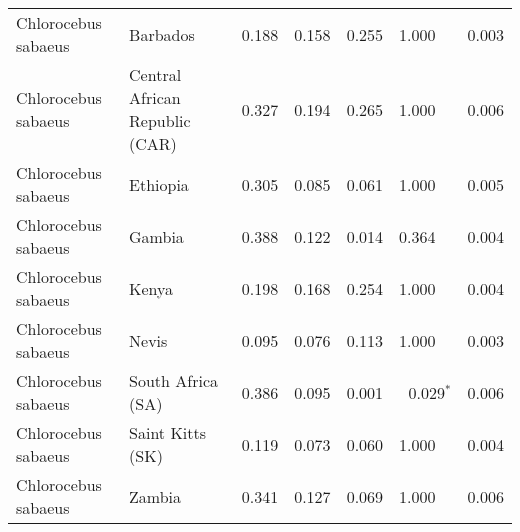 \begin{center}
\begin{adjustbox}{width = 1\textwidth}
\begin{tabular}{|l|l|r|r|r|r|r|}
 Chlorocebus sabaeus &                        Barbados &                                              0.188 &                                              0.158 &                0.255 &                                  1.000~~ &              0.003 \\
 Chlorocebus sabaeus &  Central African Republic (CAR) &                                              0.327 &                                              0.194 &                0.265 &                                  1.000~~ &              0.006 \\
 Chlorocebus sabaeus &                        Ethiopia &                                              0.305 &                                              0.085 &                0.061 &                                  1.000~~ &              0.005 \\
 Chlorocebus sabaeus &                          Gambia &                                              0.388 &                                              0.122 &                0.014 &                                  0.364~~ &              0.004 \\
 Chlorocebus sabaeus &                           Kenya &                                              0.198 &                                              0.168 &                0.254 &                                  1.000~~ &              0.004 \\
 Chlorocebus sabaeus &                           Nevis &                                              0.095 &                                              0.076 &                0.113 &                                  1.000~~ &              0.003 \\
 Chlorocebus sabaeus &               South Africa (SA) &                                              0.386 &                                              0.095 &                0.001 &                           0.029$\bm{^*}$ &              0.006 \\
 Chlorocebus sabaeus &                Saint Kitts (SK) &                                              0.119 &                                              0.073 &                0.060 &                                  1.000~~ &              0.004 \\
 Chlorocebus sabaeus &                          Zambia &                                              0.341 &                                              0.127 &                0.069 &                                  1.000~~ &              0.006 \\

\end{tabular}
\end{adjustbox}
\end{center}
